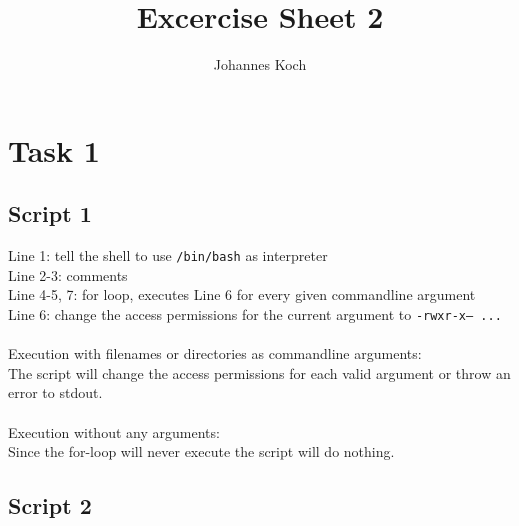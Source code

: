 \documentclass[11pt]{article} %
\title{Excercise Sheet 2}
\author{Johannes Koch}
\begin{document}
\maketitle

\section{Task 1}

\subsection{Script 1}


Line 1: tell the shell to use \texttt{/bin/bash} as interpreter\\
Line 2-3: comments\\
Line 4-5, 7: for loop, executes Line 6 for every given commandline argument\\
Line 6: change the access permissions for the current argument to \texttt{-rwxr-x--- ...}\\
\\
Execution with filenames or directories as commandline arguments:\\
The script will change the access permissions for each valid argument or throw an error to stdout.\\
\\
Execution without any arguments:\\
Since the for-loop will never execute the script will do nothing.\\
\pagebreak
\subsection{Script 2}
\end{document}
